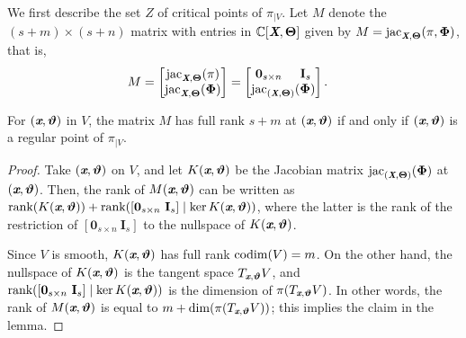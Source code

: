 \documentclass[sigconf]{acmart}
\def\Xb{\textit{\textbf{X}}}
\def\Thetab{\bm{\Theta}}
\def\thetab{\bm{\vartheta}}
\def\xb{\textit{\textbf{x}}}
\def\C{\mathbb{C}}
\def\jac{ \textrm{jac}}
\def\dt{s}
\def\bbm{\begin{bmatrix}}
\def\ebm{\end{bmatrix}}
\begin{document}
We first describe the set $Z$ of critical points of $\pi_{|V}$.  Let
$M$ denote the $(s+m) \times (s+n)$ matrix with entries in
$\C[\Xb,\Thetab]$ given by $M = \jac_{\Xb,\Thetab}(\pi,\bm\Phi)$, that
is,
\begin{align*}
M &= 
\bbm 
\jac_{\Xb,\Thetab}(\pi)\\
\jac_{\Xb,\Thetab}(\bm\Phi) 
\ebm 
=
\bbm 
\textbf{0}_{\dt \times n}\hspace{5mm}\textbf{I}_{\dt} \\
\jac_{(\Xb,\Thetab)}(\bm\Phi)
\ebm.
\end{align*}

\begin{lemma} 
  For $(\xb,\thetab)$ in $V$, the matrix $M$ has full rank $\dt+m$ at
  $(\xb,\thetab)$ if and only if $(\xb,\thetab)$ is a regular point of
  $\pi_{|V}.$
\end{lemma}
\begin{proof}
  Take $(\xb,\thetab)$ on $V$, and let $K(\xb,\thetab)$ be the
  Jacobian matrix $\jac_{(\Xb,\Thetab)}(\bm\Phi)$ at $(\xb,\thetab)$.
  Then, the rank of $M(\xb,\thetab)$ can be written as
  $\textup{rank}(K(\xb,\thetab)) + \textup{rank}([\textbf{0}_{\dt
      \times n}~\textbf{I}_{\dt}] \mid \ker K(\xb,\thetab))$, where
  the latter is the rank of the restriction of $[\textbf{0}_{\dt
      \times n}~\textbf{I}_{\dt}]$ to the nullspace of
  $K(\xb,\thetab)$.

  Since $V$ is smooth, $K(\xb,\thetab)$ has full rank ${\rm codim} (V)
  = m$. On the other hand, the nullspace of $K(\xb,\thetab)$ is the
  tangent space $T_{\xb,\thetab} V$, and
  $\textup{rank}([\textbf{0}_{\dt \times n}~\textbf{I}_{\dt}] \mid
  \ker K(\xb,\thetab))$ is the dimension of $\pi(T_{\xb,\thetab} V)$.
  In other words, the rank of $M(\xb,\thetab)$ is equal to
  $m+\dim(\pi(T_{\xb,\thetab} V))$; this implies the claim in the lemma.
\end{proof}
\end{document}
